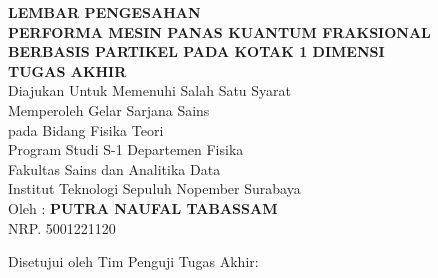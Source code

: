 \begin{center}
\large{\textbf{LEMBAR PENGESAHAN}} \\
\vspace{4mm}
\textbf{PERFORMA MESIN PANAS KUANTUM FRAKSIONAL BERBASIS PARTIKEL PADA KOTAK 1 DIMENSI} \\
\vspace{4mm}
\textbf{TUGAS AKHIR} \\
\vspace{4mm}
Diajukan Untuk Memenuhi Salah Satu Syarat \\
Memperoleh Gelar Sarjana Sains \\
pada Bidang Fisika Teori \\
Program Studi S-1 Departemen Fisika \\
Fakultas Sains dan Analitika Data\\
Institut Teknologi Sepuluh Nopember Surabaya \\
\vspace{4mm}
Oleh : \textbf{PUTRA NAUFAL TABASSAM} \\
\vspace{1mm}
NRP. 5001221120 \\
\vspace{4mm}
\begin{center}
	Disetujui oleh Tim Penguji Tugas Akhir:
\end{center}

\vspace{4ex}

\begingroup
\setlength{\tabcolsep}{0pt}


\end{center}
